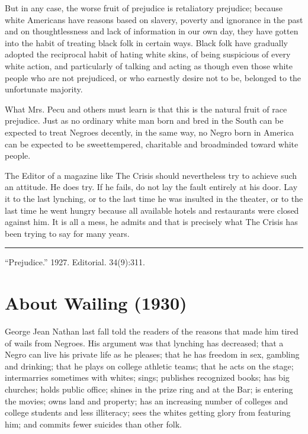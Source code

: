 \documentclass[letterpaper,10pt,english]{jupyterBook}
\begin{document}
\sphinxAtStartPar
But in any case, the worse fruit of prejudice is retaliatory prejudice; because white Americans have reasons based on slavery, poverty and ignorance in the past and on thoughtlessness and lack of information in our own day, they have gotten into the habit of treating black folk in certain ways. Black folk have gradually adopted the reciprocal habit of hating white skins, of being suspicious of every white action, and particularly of talking and acting as though even those white people who are not prejudiced, or who earnestly desire not to be, belonged to the unfortunate majority.

\sphinxAtStartPar
What Mrs. Pecu and others must learn is that this is the natural fruit of race prejudice. Just as no ordinary white man born and bred in the South can be expected to treat Negroes decently, in the same way, no Negro born in America can be expected to be sweet\sphinxhyphen{}tempered, charitable and broadminded toward white people.

\sphinxAtStartPar
The Editor of a magazine like The Crisis should nevertheless try to achieve such an attitude. He does try. If he fails, do not lay the fault entirely at his door. Lay it to the last lynching, or to the last time he was insulted in the theater, or to the last time he went hungry because all available hotels and restaurants were closed against him. It is all a mess, he admits and that is precisely what The Crisis has been trying to say for many years.


\bigskip\hrule\bigskip


\sphinxAtStartPar
{} “Prejudice.” 1927. Editorial.  34(9):311.


\section{About Wailing (1930)}
\label{\detokenize{Volumes/37/02/about_wailing:about-wailing-1930}}\label{\detokenize{Volumes/37/02/about_wailing::doc}}
\sphinxAtStartPar
George Jean Nathan last fall told the readers of the  reasons that made him tired of wails from Negroes. His argument was that lynching has decreased; that a Negro can live his private life as he pleases; that he has freedom in sex, gambling and drinking; that he plays on college athletic teams; that he acts on the stage; intermarries sometimes with whites; sings; publishes recognized books; has big churches; holds public office; shines in the prize ring and at the Bar; is entering the movies; owns land and property; has an increasing number of colleges and college students and less illiteracy; sees the whites getting glory from featuring him; and commits fewer suicides than other folk.
\end{document}
